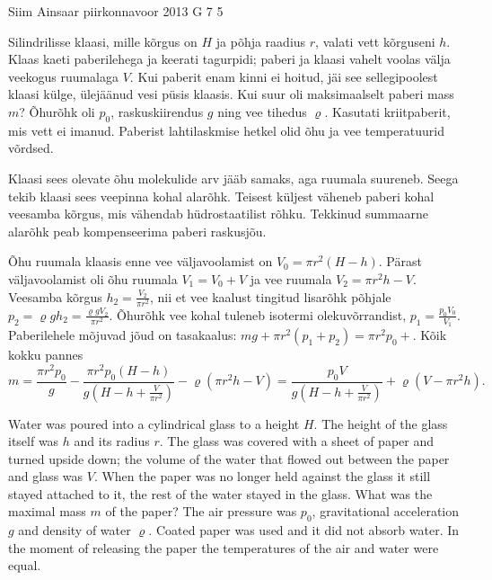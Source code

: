 {Siim Ainsaar} %
{piirkonnavoor} %
{2013} %
{G 7} %
{5} %
{
\ifStatement
Silindrilisse klaasi, mille kõrgus on $H$ ja põhja raadius $r$, valati
vett kõrguseni $h$. Klaas kaeti paberilehega ja keerati
tagurpidi; paberi ja
klaasi vahelt voolas välja veekogus ruumalaga $V$. Kui paberit enam kinni ei
hoitud, jäi see sellegipoolest klaasi külge, ülejäänud vesi püsis klaasis.
Kui suur oli maksimaalselt paberi mass $m$? Õhurõhk oli $p_0$,
raskuskiirendus $g$ ning vee tihedus $\varrho$.
Kasutati kriitpaberit, mis vett ei imanud. Paberist lahtilaskmise hetkel olid 
õhu ja vee temperatuurid võrdsed.
\fi


\ifHint
Klaasi sees olevate õhu molekulide arv jääb samaks, aga ruumala suureneb. Seega tekib klaasi sees veepinna kohal alarõhk. Teisest küljest väheneb paberi kohal veesamba kõrgus, mis vähendab hüdrostaatilist rõhku. Tekkinud summaarne alarõhk peab kompenseerima paberi raskusjõu.
\fi


\ifSolution
Õhu ruumala klaasis enne vee väljavoolamist on 
$V_0 = \pi r^2 (H-h)$.
Pärast väljavoolamist oli õhu ruumala
$V_1 = V_0 + V$
ja vee ruumala
$V_2 = \pi r^2 h - V$.
Veesamba kõrgus
$h_2 = \frac{ V_2 }{ \pi r^2 }$,
nii et vee kaalust tingitud lisarõhk põhjale
$p_2 = \varrho g h_2 = \frac{ \varrho g V_2 }{ \pi r^2 }$. Õhurõhk vee kohal tuleneb isotermi olekuvõrrandist,
$p_1 = \frac{p_0 V_0}{V_1}$.
Paberilehele mõjuvad jõud on tasakaalus:
$mg + \pi r^2 (p_1 + p_2) = \pi r^2 p_0+$.
Kõik kokku pannes
\[ m =
\frac{ \pi r^2 p_0 }{ g } -
\frac{ \pi r^2 p_0 (H-h) }{ g \left( H - h + \frac{V}{\pi r^2} \right) } -
\varrho \left( \pi r^2 h - V \right)
=
\frac{ p_0 V }{ g \left( H - h + \frac{V}{ \pi r^2 } \right) } + \varrho \left( V - \pi r^2 h \right).
\]
\fi


\ifEngStatement
Water was poured into a cylindrical glass to a height $H$. The height of the glass itself was $h$ and its radius $r$. The glass was covered with a sheet of paper and turned upside down; the volume of the water that flowed out between the paper and glass was $V$. When the paper was no longer held against the glass it still stayed attached to it, the rest of the water stayed in the glass. What was the maximal mass $m$ of the paper? The air pressure was $p_0$, gravitational acceleration $g$ and density of water $\varrho$. Coated paper was used and it did not absorb water. In the moment of releasing the paper the temperatures of the air and water were equal.
\fi


}
